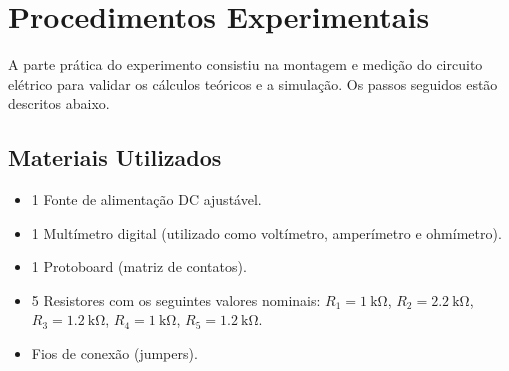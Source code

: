 \documentclass[a4paper, 12pt]{article}
\begin{document}
\section{Procedimentos Experimentais}

A parte prática do experimento consistiu na montagem e medição do circuito elétrico para validar os cálculos teóricos e a simulação. Os passos seguidos estão descritos abaixo.

\subsection{Materiais Utilizados}
\begin{itemize}
\item 1 Fonte de alimentação DC ajustável.
\item 1 Multímetro digital (utilizado como voltímetro, amperímetro e ohmímetro).
\item 1 Protoboard (matriz de contatos).
\item 5 Resistores com os seguintes valores nominais: $R_1=\SI{1}{\kilo\ohm}$, $R_2=\SI{2.2}{\kilo\ohm}$, $R_3=\SI{1.2}{\kilo\ohm}$, $R_4=\SI{1}{\kilo\ohm}$, $R_5=\SI{1.2}{\kilo\ohm}$.
\item Fios de conexão (jumpers).
\end{itemize}
\end{document}
